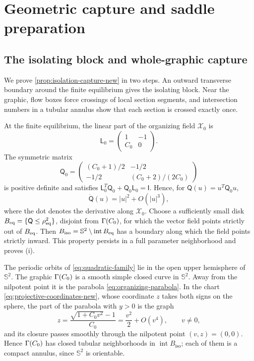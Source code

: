 \section{Geometric capture and saddle preparation}
\label{app:geometric-saddle-details}

\subsection{The isolating block and whole-graphic capture}
\label{app:graphic-capture-details}

We prove \cref{prop:isolation-capture-new} in two steps. An outward
transverse boundary around the finite equilibrium gives the isolating
block. Near the graphic, flow boxes force crossings of local section
segments, and intersection numbers in a tubular annulus show that
each section is crossed exactly once.

At the finite equilibrium, the linear part of the organizing field \(\mathcal X_0\) is
\[
 \mathsf L_0=\begin{pmatrix}1&-1\\ C_0&0\end{pmatrix}.
\]
The symmetric matrix
\[
 \mathsf Q_0=\begin{pmatrix}
 (C_0+1)/2&-1/2\\[1mm]
 -1/2&(C_0+2)/(2C_0)
 \end{pmatrix}
\]
is positive definite and satisfies
$\mathsf L_0^T\mathsf Q_0+\mathsf Q_0\mathsf L_0=\mathsf I$.  Hence, for
$\mathsf Q(u)=u^T\mathsf Q_0u$,
\[
 \dot{\mathsf Q}(u)=|u|^2+O(|u|^3),
\]
where the dot denotes the derivative along $\mathcal X_0$.
Choose a sufficiently small disk $B_{\rm eq}=\{\mathsf Q\le\rho_{\rm eq}^2\}$,
disjoint from $\Gamma(C_0)$, for which the vector field points strictly out of
$B_{\rm eq}$.  Then $B_{\mathrm{iso}}=\mathbb S^2\setminus\operatorname{int}B_{\rm eq}$
has a boundary along which the field points strictly inward. This
property persists in a full parameter neighborhood and proves (i).

The periodic orbits of \eqref{eq:quadratic-family} lie in the open upper
hemisphere of $\mathbb S^2$. The graphic
$\Gamma(C_0)$ is a smooth simple closed curve in $\mathbb S^2$. Away from the nilpotent
point it is the parabola \eqref{eq:organizing-parabola}. In the chart
\eqref{eq:projective-coordinates-new}, whose coordinate $z$ takes both signs
on the sphere, the part of the parabola with $y>0$ is the graph
\[
 z=\frac{\sqrt{1+C_0v^2}-1}{C_0}=\frac{v^2}{2}+O(v^4),\qquad v\ne0,
\]
and its closure passes smoothly through the nilpotent point $(v,z)=(0,0)$.
Hence $\Gamma(C_0)$ has closed tubular neighborhoods in
$\operatorname{int}B_{\mathrm{iso}}$; each of them is a compact annulus,
since $\mathbb S^2$ is orientable.

